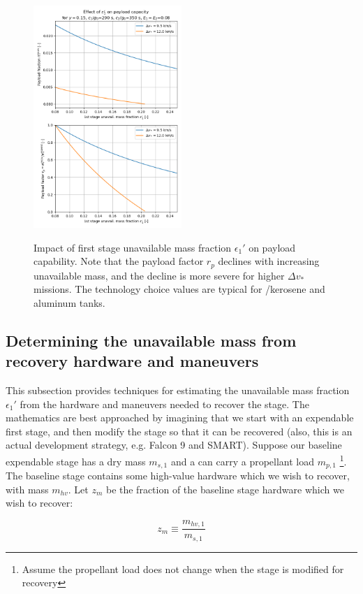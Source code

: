 \documentclass[conf]{new-aiaa}
\begin{document}
\begin{figure}[hbt!]
	\centering
	\includegraphics[width=0.5\textwidth]{../payload}
	\label{fig:payload}
	\caption{Impact of first stage unavailable mass fraction $\epsilon_1'$ on payload capability. Note that the payload factor $r_p$ declines with increasing unavailable mass, and the decline is more severe for higher $\Delta v_*$ missions. The technology choice values are typical for /kerosene and aluminum tanks.}
\end{figure}


\subsection{Determining the unavailable mass from recovery hardware and maneuvers}
This subsection provides techniques for estimating the unavailable mass fraction $\epsilon_1'$ from the hardware and maneuvers needed to recover the stage. The mathematics are best approached by imagining that we start with an expendable first stage, and then modify the stage so that it can be recovered (also, this is an actual development strategy, e.g. Falcon 9 and SMART). Suppose our baseline expendable stage has a dry mass $m_{s,1}$ and a can carry a propellant load $m_{p,1}$ \footnote{Assume the propellant load does not change when the stage is modified for recovery}. The baseline stage contains some high-value hardware which we wish to recover, with mass $m_{hv}$. Let $z_m$ be the fraction of the baseline stage hardware which we wish to recover:

\begin{equation}
z_m \equiv \frac{m_{hv,1}}{m_{s,1}}
\end{equation}
\end{document}
